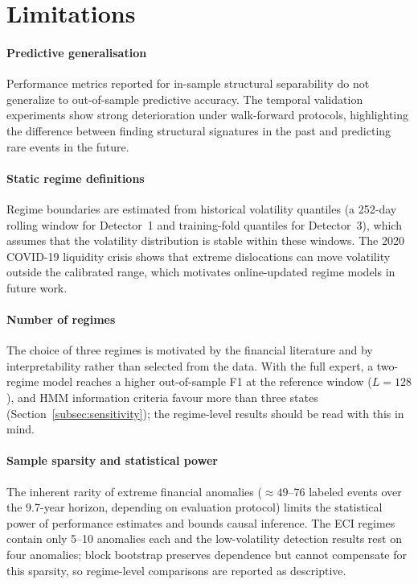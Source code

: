 \documentclass[]{interact}
\begin{document}
\section{Limitations}
\label{sec:limitations}

\paragraph{Predictive generalisation}
Performance metrics reported for in-sample structural separability do not generalize to out-of-sample predictive accuracy. The temporal validation experiments show strong deterioration under walk-forward protocols, highlighting the difference between finding structural signatures in the past and predicting rare events in the future.

\paragraph{Static regime definitions}
Regime boundaries are estimated from historical volatility quantiles (a 252-day rolling window for Detector~1 and training-fold quantiles for Detector~3), which assumes that the volatility distribution is stable within these windows. The 2020 COVID-19 liquidity crisis shows that extreme dislocations can move volatility outside the calibrated range, which motivates online-updated regime models in future work.
\paragraph{Number of regimes}
The choice of three regimes is motivated by the financial literature and by interpretability rather than selected from the data. With the full expert, a two-regime model reaches a higher out-of-sample F1 at the reference window ($L=128$), and HMM information criteria favour more than three states (Section~\ref{subsec:sensitivity}); the regime-level results should be read with this in mind.

\paragraph{Sample sparsity and statistical power}
The inherent rarity of extreme financial anomalies (${\approx}49$--76 labeled events over the 9.7-year horizon, depending on evaluation protocol) limits the statistical power of performance estimates and bounds causal inference. The ECI regimes contain only 5--10 anomalies each and the low-volatility detection results rest on four anomalies; block bootstrap preserves dependence but cannot compensate for this sparsity, so regime-level comparisons are reported as descriptive.
\end{document}

